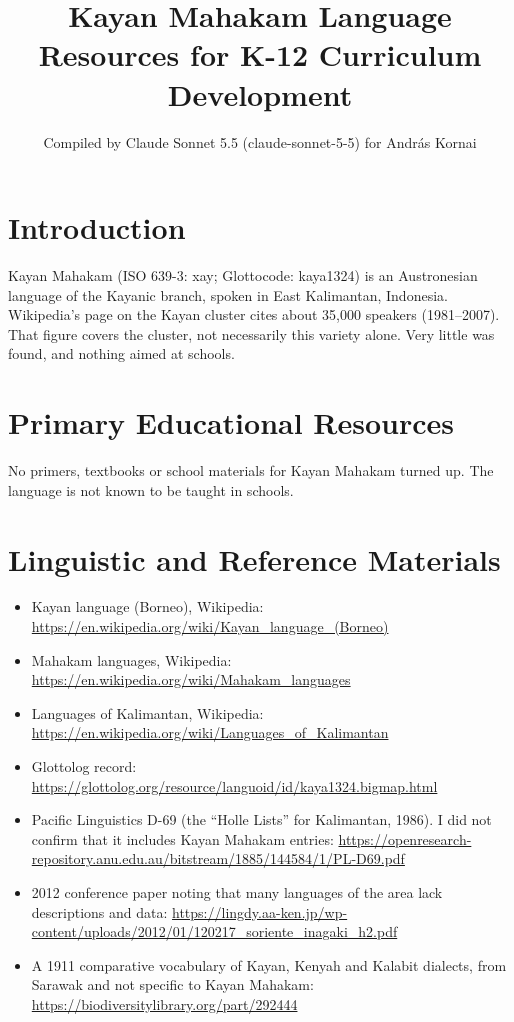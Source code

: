 \documentclass[12pt]{article}
\title{Kayan Mahakam Language Resources for K-12 Curriculum Development}
\author{Compiled by Claude Sonnet 5.5 (claude-sonnet-5-5) for Andr\'as Kornai}
\date{}
\begin{document}
\maketitle

\section{Introduction}
Kayan Mahakam (ISO 639-3: xay; Glottocode: kaya1324) is an Austronesian language of the Kayanic branch, spoken in East Kalimantan, Indonesia. Wikipedia's page on the Kayan cluster cites about 35,000 speakers (1981--2007). That figure covers the cluster, not necessarily this variety alone. Very little was found, and nothing aimed at schools.

\section{Primary Educational Resources}
No primers, textbooks or school materials for Kayan Mahakam turned up. The language is not known to be taught in schools.

\section{Linguistic and Reference Materials}
\begin{itemize}
\item Kayan language (Borneo), Wikipedia: \url{https://en.wikipedia.org/wiki/Kayan_language_(Borneo)}
\item Mahakam languages, Wikipedia: \url{https://en.wikipedia.org/wiki/Mahakam_languages}
\item Languages of Kalimantan, Wikipedia: \url{https://en.wikipedia.org/wiki/Languages_of_Kalimantan}
\item Glottolog record: \url{https://glottolog.org/resource/languoid/id/kaya1324.bigmap.html}
\item Pacific Linguistics D-69 (the ``Holle Lists'' for Kalimantan, 1986). I did not confirm that it includes Kayan Mahakam entries: \url{https://openresearch-repository.anu.edu.au/bitstream/1885/144584/1/PL-D69.pdf}
\item 2012 conference paper noting that many languages of the area lack descriptions and data: \url{https://lingdy.aa-ken.jp/wp-content/uploads/2012/01/120217_soriente_inagaki_h2.pdf}
\item A 1911 comparative vocabulary of Kayan, Kenyah and Kalabit dialects, from Sarawak and not specific to Kayan Mahakam: \url{https://biodiversitylibrary.org/part/292444}
\end{itemize}
\end{document}
